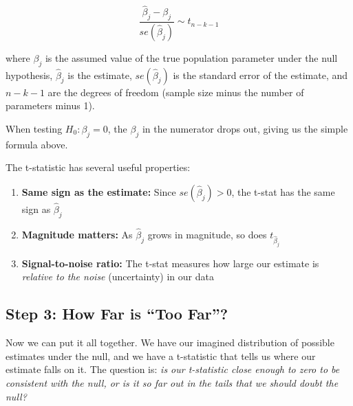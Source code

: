 \documentclass[
  letterpaper,
  DIV=11,
  numbers=noendperiod]{scrreprt}
\begin{document}
\[\frac{\hat{\beta}_j - \beta_j}{se(\hat{\beta}_j)} \sim t_{n-k-1}\]

where \(\beta_j\) is the assumed value of the true population parameter
under the null hypothesis, \(\hat{\beta}_j\) is the estimate,
\(se(\hat{\beta}_j)\) is the standard error of the estimate, and
\(n - k - 1\) are the degrees of freedom (sample size minus the number
of parameters minus 1).

When testing \(H_0: \beta_j = 0\), the \(\beta_j\) in the numerator
drops out, giving us the simple formula above.

The t-statistic has several useful properties:

\begin{enumerate}
\def\labelenumi{\arabic{enumi}.}
\item
  \textbf{Same sign as the estimate:} Since \(se(\hat{\beta}_j) > 0\),
  the t-stat has the same sign as \(\hat{\beta}_j\)
\item
  \textbf{Magnitude matters:} As \(\hat{\beta}_j\) grows in magnitude,
  so does \(t_{\hat{\beta}_j}\)
\item
  \textbf{Signal-to-noise ratio:} The t-stat measures how large our
  estimate is \emph{relative to the noise} (uncertainty) in our data
\end{enumerate}

\subsection{Step 3: How Far is ``Too
Far''?}\label{step-3-how-far-is-too-far}

Now we can put it all together. We have our imagined distribution of
possible estimates under the null, and we have a t-statistic that tells
us where our estimate falls on it. The question is: \emph{is our
t-statistic close enough to zero to be consistent with the null, or is
it so far out in the tails that we should doubt the null?}
\end{document}
